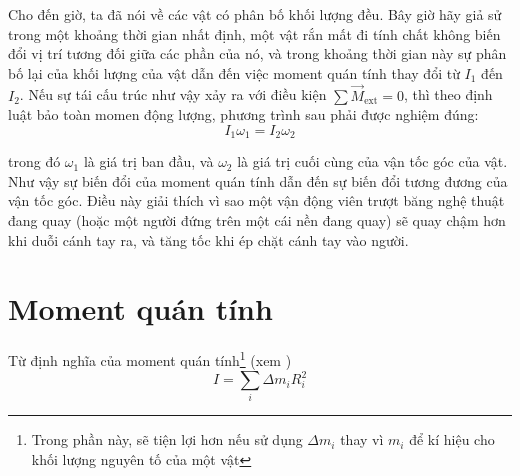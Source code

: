Cho đến giờ, ta đã nói về các vật có phân bố khối lượng đều. Bây giờ hãy giả sử trong một khoảng thời gian nhất định, một vật rắn mất đi tính chất không biến đổi vị trí tương đối giữa các phần của nó, và trong khoảng thời gian này sự phân bố lại của khối lượng của vật dẫn đến việc moment quán tính thay đổi từ $I_1$ đến $I_2$. Nếu sự tái cấu trúc như vậy xảy ra với điều kiện $\sum\vec{M}_{\text{ext}}=0$, thì theo định luật bảo toàn momen động lượng, phương trình sau phải được nghiệm đúng:
\begin{equation}\label{eq:5_16}
I_1\omega_1 = I_2\omega_2
\end{equation}

\noindent
trong đó $\omega_1$ là giá trị ban đầu, và $\omega_2$ là giá trị cuối cùng của vận tốc góc của vật. Như vậy sự biến đổi của moment quán tính dẫn đến sự biến đổi tương đương của vận tốc góc. Điều này giải thích vì sao một vận động viên trượt băng nghệ thuật đang quay (hoặc một người đứng trên một cái nền đang quay) sẽ quay chậm hơn khi duỗi cánh tay ra, và tăng tốc khi ép chặt cánh tay vào người.

\section{Moment quán tính}\label{sec:5_4}

Từ định nghĩa của moment quán tính\footnote{Trong phần này, sẽ tiện lợi hơn nếu sử dụng $\Delta m_i$ thay vì $m_i$ để kí hiệu cho khối lượng nguyên tố của một vật} (xem )
\begin{equation*}
I = \sum_i \Delta m_i R_i^2
\end{equation*}

